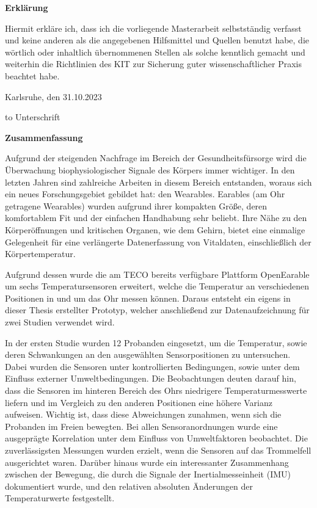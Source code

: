 \thispagestyle{empty}
\vspace*{30\baselineskip}
\textbf{Erklärung}

\par
Hiermit erkläre ich, dass ich die vorliegende Masterarbeit selbstständig verfasst und keine anderen als die angegebenen Hilfsmittel und Quellen benutzt habe, die wörtlich oder inhaltlich übernommenen Stellen als solche kenntlich gemacht und weiterhin die Richtlinien des KIT zur Sicherung guter wissenschaftlicher Praxis beachtet habe.

Karlsruhe, den 31.10.2023

\vspace*{5\baselineskip}
\hbox to \textwidth{\hrulefill}
Unterschrift

\cleardoublepage

\vspace*{1em}
\begin{center}
	\textbf{Zusammenfassung}
\end{center}
\par

Aufgrund der steigenden Nachfrage im Bereich der Gesundheitsfürsorge wird die Überwachung biophysiologischer Signale des Körpers immer wichtiger.
In den letzten Jahren sind zahlreiche Arbeiten in diesem Bereich entstanden, woraus sich ein neues Forschungsgebiet gebildet hat: den Wearables.
Earables (am Ohr getragene Wearables) wurden aufgrund ihrer kompakten Größe, deren komfortablem Fit und der einfachen Handhabung sehr beliebt. 
Ihre Nähe zu den Körperöffnungen und kritischen Organen, wie dem Gehirn, bietet eine einmalige Gelegenheit für eine verlängerte Datenerfassung von Vitaldaten, einschließlich der Körpertemperatur.

Aufgrund dessen wurde die am TECO bereits verfügbare Plattform OpenEarable um sechs Temperatursensoren erweitert, welche die Temperatur an verschiedenen Positionen in und um das Ohr messen können. 
Daraus entsteht ein eigens in dieser Thesis erstellter Prototyp, welcher anschließend zur Datenaufzeichnung für zwei Studien verwendet wird.

In der ersten Studie wurden 12 Probanden eingesetzt, um die Temperatur, sowie deren Schwankungen an den ausgewählten Sensorpositionen zu untersuchen. 
Dabei wurden die Sensoren unter kontrollierten Bedingungen, sowie unter dem Einfluss externer Umweltbedingungen. 
Die Beobachtungen deuten darauf hin, dass die Sensoren im hinteren Bereich des Ohrs niedrigere Temperaturmesswerte liefern und im Vergleich zu den anderen Positionen eine höhere Varianz aufweisen. 
Wichtig ist, dass diese Abweichungen zunahmen, wenn sich die Probanden im Freien bewegten. 
Bei allen Sensoranordnungen wurde eine ausgeprägte Korrelation unter dem Einfluss von Umweltfaktoren beobachtet. 
Die zuverlässigsten Messungen wurden erzielt, wenn die Sensoren auf das Trommelfell ausgerichtet waren. 
Darüber hinaus wurde ein interessanter Zusammenhang zwischen der Bewegung, die durch die Signale der Inertialmesseinheit (IMU) dokumentiert wurde, und den relativen absoluten Änderungen der Temperaturwerte festgestellt.

